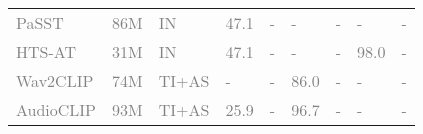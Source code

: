 \documentclass{article}
\theoremstyle{plain}
\theoremstyle{definition}
\theoremstyle{remark}
\begin{document}
\begin{table*}[t]
{\begin{tabular}{lllllllll}
         \textcolor{gray}{PaSST} \citep{koutini2021efficient} & \textcolor{gray}{86M} & \textcolor{gray}{IN} &  \textcolor{gray}{47.1}  & \textcolor{gray}{-} & \textcolor{gray}{-} & \textcolor{gray}{-} & \textcolor{gray}{-} & \textcolor{gray}{-} \\
         \textcolor{gray}{HTS-AT} \citep{chen2022hts} & \textcolor{gray}{31M} & \textcolor{gray}{IN} &  \textcolor{gray}{47.1} & \textcolor{gray}{-} & \textcolor{gray}{-} & \textcolor{gray}{-} & \textcolor{gray}{98.0} & \textcolor{gray}{-} \\
         \textcolor{gray}{Wav2CLIP} \citep{wu2022wav2clip} & \textcolor{gray}{74M} & \textcolor{gray}{TI+AS} &  \textcolor{gray}{-} & \textcolor{gray}{-} & \textcolor{gray}{86.0} & \textcolor{gray}{-} & \textcolor{gray}{-} & \textcolor{gray}{-} \\
         \textcolor{gray}{AudioCLIP} \citep{guzhov2022audioclip} & \textcolor{gray}{93M} & \textcolor{gray}{TI+AS} &  \textcolor{gray}{25.9} & \textcolor{gray}{-} & \textcolor{gray}{96.7} & \textcolor{gray}{-} & \textcolor{gray}{-} & \textcolor{gray}{-} \\


\end{tabular}}
\end{table*}
\end{document}
